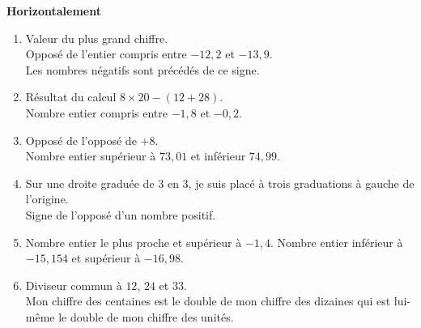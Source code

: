    \begin{multicols}{2}
   {\bf Horizontalement} \\
   \begin{enumerate}
      \item Valeur du plus grand chiffre. \\
         Opposé de l'entier compris entre $-12,2$ et $-13,9$. \\
         Les nombres négatifs sont précédés de ce signe. \\
      \item Résultat du calcul $8\times20-(12+28)$. \\
         Nombre entier compris entre $-1,8$ et $-0,2$. \\
      \item Opposé de l’opposé de $+8$. \\
         Nombre entier supérieur à $73,01$ et inférieur $74,99$. \\
      \item Sur une droite graduée de $3$ en $3$, je suis placé à trois graduations à gauche de l'origine. \\
         Signe de l’opposé d'un nombre positif. \\
      \item Nombre entier le plus proche et supérieur à $-1,4$.
         Nombre entier inférieur à $-15,154$ et supérieur à $-16,98$. \\
      \item Diviseur commun à $12$, $24$ et $33$. \\
         Mon chiffre des centaines est le double de mon chiffre des dizaines qui est lui-même le double de mon chiffre des unités. \\ [1mm]
      \end{enumerate}
      

\end{multicols}
